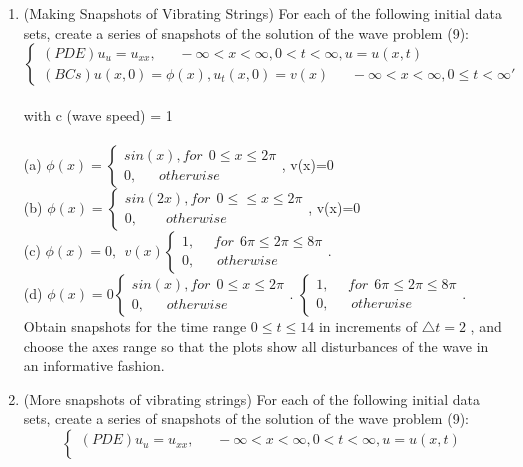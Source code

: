 \documentclass[../main.tex]{subfiles}
\begin{document}
{{\begin{enumerate}
 \item
		(Making Snapshots of Vibrating Strings) For each of the following initial data sets, create a 
series of snapshots of the solution of the wave problem (9): 
$$
\begin{cases} 
(PDE) u_u=u_{xx}, ~~~~~~~ -\infty <x< \infty ,0<t< \infty , u=u(x,t)\\ 
(BCs) u(x,0)=\phi (x) , u_t(x,0)=v(x) ~~~~~~~ -\infty <x <\infty ,0 \leqslant t< \infty '
\end{cases}$$
\\
with c (wave speed) = 1
\\
\\
(a) 
$\phi(x)=
\begin{cases} 
sin(x), for~~ 0 \leqslant x\leqslant 2 \pi \\
0, ~~~~~~~otherwise
\end{cases}$, v(x)=0
\\
(b)
$\phi(x)=
\begin{cases} 
sin(2x), for~~ 0\leqslant \leqslant x\leqslant 2 \pi \\
0, ~~~~~~~~~otherwise
\end{cases}$, v(x)=0
\\
(c)
$\phi(x)=0 , ~~ v(x)
\begin{cases} 
1 , ~~~~~~for~~ 6 \pi  \leqslant 2\pi \leqslant 8\pi\\
0, ~~~~~~~otherwise
\end{cases}$.
\\
(d)
$\phi(x)=0
\begin{cases} 
sin(x), for ~~0 \leqslant x\leqslant 2 \pi \\
0, ~~~~~~~otherwise
\end{cases}$.
$\begin{cases} 
1 , ~~~~~~for~~ 6 \pi \leqslant 2 \pi \leqslant 8\pi  \\
0, ~~~~~~~otherwise
\end{cases}$.
\\
Obtain snapshots for the time range $0\leqslant t \leqslant 14$ in increments of $\bigtriangleup t=2$ , and choose the axes 
range so that the plots show all disturbances of the wave in an informative fashion. 
	\item
			(More snapshots of vibrating strings) For each of the following initial data sets, create a series 
of snapshots of the solution of the wave problem (9): 
$$\begin{cases} 
(PDE) u_u=u_{xx}, ~~~~~~~ -\infty <x< \infty ,0<t< \infty , u=u(x,t)\\ 

\end{cases}$$
\end{enumerate}}}
\end{document}

